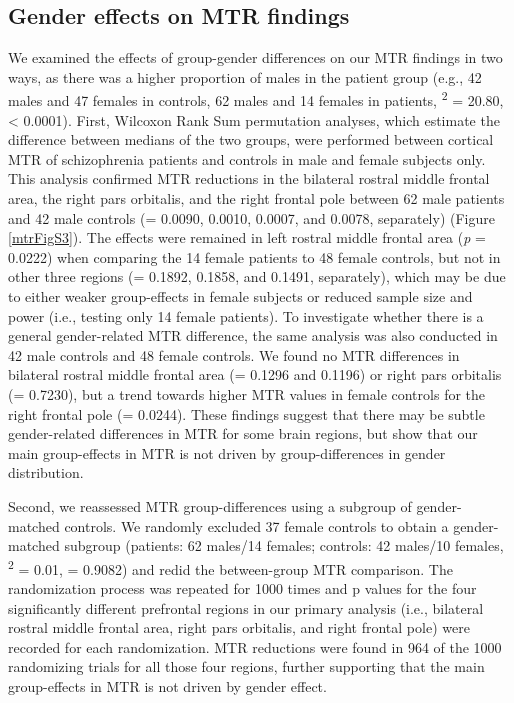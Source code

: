 \begin{refsection}
\subsection*{Gender effects on MTR findings}
We examined the effects of group-gender differences on our MTR findings in two ways, as there was a higher proportion of males in the patient group (e.g., 42 males and 47 females in controls, 62 males and 14 females in patients, \textchi\textsuperscript{2} = 20.80, \pval < 0.0001). First, Wilcoxon Rank Sum permutation analyses, which estimate the difference between medians of the two groups, were performed between cortical MTR of schizophrenia patients and controls in male and female subjects only. This analysis confirmed MTR reductions in the bilateral rostral middle frontal area, the right pars orbitalis, and the right frontal pole between 62 male patients and 42 male controls (\pval = 0.0090, 0.0010, 0.0007, and 0.0078, separately) (Figure \ref{mtrFigS3}). The effects were remained in left rostral middle frontal area (\textit{p} = 0.0222) when comparing the 14 female patients to 48 female controls, but not in other three regions (\pval = 0.1892, 0.1858, and 0.1491, separately), which may be due to either weaker group-effects in female subjects or reduced sample size and power (i.e., testing only 14 female patients). To investigate whether there is a general gender-related MTR difference, the same analysis was also conducted in 42 male controls and 48 female controls. We found no MTR differences in bilateral rostral middle frontal area (\pval = 0.1296 and 0.1196) or right pars orbitalis (\pval = 0.7230), but a trend towards higher MTR values in female controls for the right frontal pole (\pval = 0.0244). These findings suggest that there may be subtle gender-related differences in MTR for some brain regions, but show that our main group-effects in MTR is not driven by group-differences in gender distribution.

Second, we reassessed MTR group-differences using a subgroup of gender-matched controls. We randomly excluded 37 female controls to obtain a gender-matched subgroup (patients: 62 males/14 females; controls: 42 males/10 females, \textchi\textsuperscript{2} = 0.01, \pval = 0.9082) and redid the between-group MTR comparison. The randomization process was repeated for 1000 times and p values for the four significantly different prefrontal regions in our primary analysis (i.e., bilateral rostral middle frontal area, right pars orbitalis, and right frontal pole) were recorded for each randomization. MTR reductions were found in 964 of the 1000 randomizing trials for all those four regions, further supporting that the main group-effects in MTR is not driven by gender effect.


\end{refsection}
